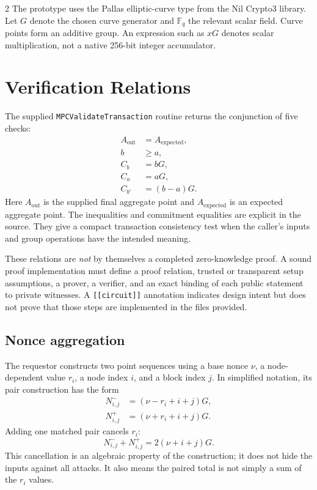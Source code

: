 \documentclass[10pt,letterpaper]{article}
\begin{document}
\begin{multicols}{2}
The prototype uses the Pallas elliptic-curve type from the Nil Crypto3 library. Let $G$ denote the chosen curve generator and $\mathbb F_q$ the relevant scalar field. Curve points form an additive group. An expression such as $xG$ denotes scalar multiplication, not a native 256-bit integer accumulator.

\section{Verification Relations}
The supplied \texttt{MPCValidate}\allowbreak\texttt{Transaction} routine returns the conjunction of five checks:
\begin{align}
 A_{\mathrm{out}} &= A_{\mathrm{expected}},\\
 b &\ge a,\\
 C_b &= bG,\\
 C_a &= aG,\\
 C_{b'} &= (b-a)G.
\end{align}
Here $A_{\mathrm{out}}$ is the supplied final aggregate point and $A_{\mathrm{expected}}$ is an expected aggregate point. The inequalities and commitment equalities are explicit in the source. They give a compact transaction consistency test when the caller's inputs and group operations have the intended meaning.

These relations are \emph{not} by themselves a completed zero-knowledge proof. A sound proof implementation must define a proof relation, trusted or transparent setup assumptions, a prover, a verifier, and an exact binding of each public statement to private witnesses. A \texttt{[[circuit]]} annotation indicates design intent but does not prove that those steps are implemented in the files provided.

\subsection{Nonce aggregation}
The requestor constructs two point sequences using a base nonce $\nu$, a node-dependent value $r_i$, a node index $i$, and a block index $j$. In simplified notation, its pair construction has the form
\begin{align}
 N^-_{i,j} &= (\nu-r_i+i+j)G,\\
 N^+_{i,j} &= (\nu+r_i+i+j)G.
\end{align}
Adding one matched pair cancels $r_i$:
\begin{equation}
 N^-_{i,j}+N^+_{i,j}=2(\nu+i+j)G.
\end{equation}
This cancellation is an algebraic property of the construction; it does not hide the inputs against all attacks. It also means the paired total is not simply a sum of the $r_i$ values.


\end{multicols}
\end{document}
